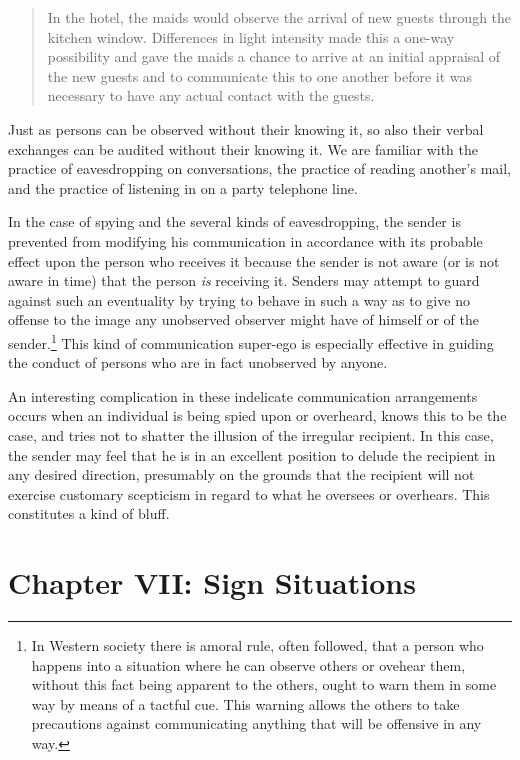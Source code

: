 \documentclass[openany,nobib]{tufte-book}
\let\oldchapter\chapter
\def\chapter{%
  \setcounter{footnote}{0}%
  \oldchapter
}
\begin{document}
\begin{quote}
In the hotel, the maids would observe the arrival of new guests through
the kitchen window. Differences in light intensi­ty made this a one-way
possibility and gave the maids a chance to arrive at an initial
appraisal of the new guests and to communicate this to one another
before it was necessary to have any actual contact with the guests.
\end{quote}

\noindent Just as persons can be observed without their knowing it, so also their
verbal exchanges can be audited without their knowing it. We are
familiar with the practice of eavesdropping on conversations, the
practice of reading another's mail, and the practice of listening in on
a party telephone line.

In the case of spying and the several kinds of eaves­dropping, the sender
is prevented from modifying his communication in accordance with its
probable effect upon the person who receives it because the sender is
not aware (or is not aware in time) that the person \emph{is }receiving
it. Senders may attempt to guard against such an eventuality by trying
to behave in such a way as to give no offense to the image any
unobserved observer might have of himself or of the sender.\footnote{In
  Western society there is amoral rule, often followed, that a person
  who happens into a situation where he can observe others or ovehear
  them, without this fact being apparent to the others, ought to warn
  them in some way by means of a tactful cue. This warning allows the
  others to take precautions against communicating anything that will be
  offensive in any way.} This kind of communication super-ego is
especially effective in guiding the conduct of persons who are in fact
unobserved by anyone.

An interesting complication in these indelicate communication
arrangements occurs when an individual is being spied upon or overheard,
knows this to be the case, and tries not to shatter the illusion of the
irregular recipient. In this case, the sender may feel that he is in an
excellent position to de­lude the recipient in any desired direction,
presumably on the grounds that the recipient will not exercise customary
scepticism in regard to what he oversees or overhears. This constitutes
a kind of bluff.

\chapter[CHAPTER VII: SIGN SITUATIONS]{Chapter VII: Sign Situations}
\label{ch:Chapter VII: Sign Situations}
\end{document}
